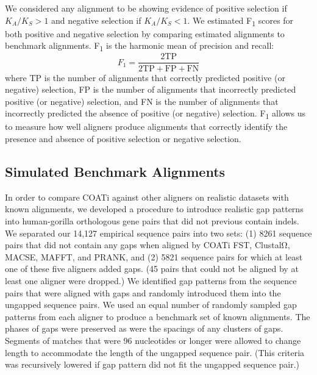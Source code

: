 \documentclass[12pt,letterpaper]{article}
\begin{document}
We considered any alignment to be showing evidence of positive selection if $K_A/K_S > 1$ and negative selection if $K_A/K_S < 1$. We estimated F\textsubscript{1} scores for both positive and negative selection by comparing estimated alignments to benchmark alignments. F\textsubscript{1} is the harmonic mean of precision and recall:
\[
F_1 = \frac{2 \text{TP}}{2 \text{TP} + \text{FP} + \text{FN}}
\]
where TP is the number of alignments that correctly predicted positive (or negative) selection, FP is the number of alignments that incorrectly predicted positive (or negative) selection, and FN is the number of alignments that incorrectly predicted the absence of positive (or negative) selection. F\textsubscript{1} allows us to measure how well aligners produce alignments that correctly identify the presence and absence of positive selection or negative selection.

\subsection*{Simulated Benchmark Alignments}

In order to compare COATi against other aligners on realistic datasets with known alignments, we developed a procedure to introduce realistic gap patterns into human-gorilla orthologous gene pairs that did not previous contain indels. We separated our 14,127 empirical sequence pairs into two sets: %
(1) 8261 sequence pairs that did not contain any gaps when aligned by COATi FST, ClustalΩ, MACSE, MAFFT, and PRANK, and (2) 5821 sequence pairs for which at least one of these five aligners added gaps.
(45 pairs that could not be aligned by at least one aligner were dropped.) We identified gap patterns from the sequence pairs that were aligned with gaps and randomly introduced them into the ungapped sequence pairs. We used an equal number of randomly sampled gap patterns from each aligner to produce a benchmark set of known alignments. The phases of gaps were preserved as were the spacings of any clusters of gaps. Segments of matches that were 96 nucleotides or longer were allowed to change length to accommodate the length of the ungapped sequence pair. (This criteria was recursively lowered if gap pattern did not fit the ungapped sequence pair.)
\end{document}
